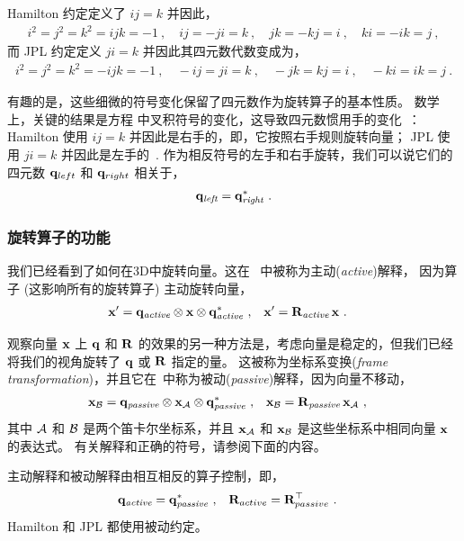 Hamilton 约定定义了 $ij=k$ 并因此，
%
\begin{align}
i^2 = j^2 = k^2 = ijk = -1~,\quad ij = -ji = k~, \quad jk = -kj = i~, \quad ki = -ik = j~,
\end{align}
%
而 JPL 约定定义 $ji=k$ 并因此其四元数代数变成为，
%
\begin{align}
i^2 = j^2 = k^2 = -ijk = -1~,\quad -ij = ji = k~, \quad -jk = kj = i~, \quad -ki = ik = j~.
\end{align}

有趣的是，这些细微的符号变化保留了四元数作为旋转算子的基本性质。 
数学上，关键的结果是方程  中叉积符号的变化，这导致四元数惯用手的变化~\citep{SHUSTER-93}：
Hamilton 使用 $ij=k$ 并因此是右手的，即，它按照右手规则旋转向量； JPL 使用 $ji=k$ 并因此是左手的~\citep{TRAWNY-05-QUAT}. 
作为相反符号的左手和右手旋转，我们可以说它们的四元数 ${\bf q}_{left}$ 和 ${\bf q}_{right}$ 相关于，
%
\begin{align}
{\bf q}_{\textit{left}}= {\bf q}_{\textit{right}}^*~.
\end{align}



\subsubsection{旋转算子的功能}

我们已经看到了如何在3D中旋转向量。这在~\citep{SHUSTER-93} 中被称为主动(\emph{active})解释， 
因为算子 (这影响所有的旋转算子) 主动旋转向量，
%
\begin{align}
{\bf x}' &={\bf q}_{\textit{active}}\otimes{\bf x}\otimes{\bf q}_{\textit{active}}^* ~,
& 
{\bf x}' &= {\bf R}_{\textit{active}}\,{\bf x}~.
\end{align}

观察向量 ${\bf x}$ 上 ${\bf q}$ 和 ${\bf R}$ 的效果的另一种方法是，考虑向量是稳定的，但我们已经将我们的视角旋转了 ${\bf q}$ 或 ${\bf R}$ 指定的量。 
这被称为坐标系变换(\emph{frame transformation})，并且它在~\citep{SHUSTER-93}中称为被动(\emph{passive})解释，因为向量不移动，
%
\begin{align}
{\bf x}_{\mathcal{B}} &= {\bf q}_{\textit{passive}}\otimes{\bf x}_{\mathcal{A}}\otimes{\bf q}_{\textit{passive}}^*~,
&
{\bf x}_{\mathcal{B}}&={\bf R}_{\textit{passive}}\,{\bf x}_{\mathcal{A}}~,
\end{align}
%
其中 $\mathcal{A}$ 和 $\mathcal{B}$ 是两个笛卡尔坐标系，并且 ${\bf x}_{\mathcal{A}}$ 和 ${\bf x}_{\mathcal{B}}$ 是这些坐标系中相同向量 ${\bf x}$ 的表达式。 
有关解释和正确的符号，请参阅下面的内容。


主动解释和被动解释由相互相反的算子控制，即， 
%
\begin{align*}
{\bf q}_{\textit{active}} &= {\bf q}_{\textit{passive}}^* ~,
& 
{\bf R}_{active} &= {\bf R}_{passive}^{\top} ~.
\end{align*}
%
Hamilton 和 JPL 都使用被动约定。 


